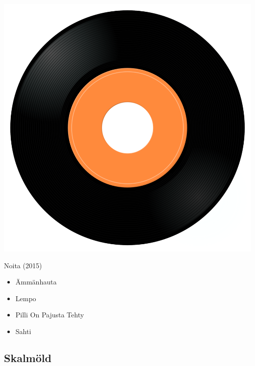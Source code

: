 \begin{minipage}[t]{0.25\textwidth}
\captionsetup{type=figure}
\includegraphics[width=\textwidth]{Images/cover.png}
\caption*{Noita (2015)}
\end{minipage}
\begin{minipage}[t]{0.25\textwidth}\vspace{0pt}
\begin{itemize}[nosep,leftmargin=1em,labelwidth=*,align=left]
	\setlength{\itemsep}{0pt}
	\item Ämmänhauta
	\item Lempo
	\item Pilli On Pajusta Tehty
	\item Sahti
\end{itemize}
\end{minipage}

\subsection{Skalmöld}

